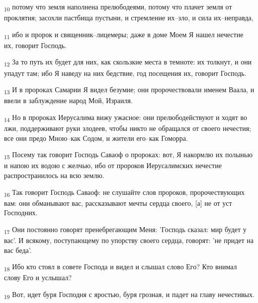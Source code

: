 \begin{tcolorbox}
\textsubscript{10} потому что земля наполнена прелюбодеями, потому что плачет земля от проклятия; засохли пастбища пустыни, и стремление их--зло, и сила их--неправда,
\end{tcolorbox}
\begin{tcolorbox}
\textsubscript{11} ибо и пророк и священник--лицемеры; даже в доме Моем Я нашел нечестие их, говорит Господь.
\end{tcolorbox}
\begin{tcolorbox}
\textsubscript{12} За то путь их будет для них, как скользкие места в темноте: их толкнут, и они упадут там; ибо Я наведу на них бедствие, год посещения их, говорит Господь.
\end{tcolorbox}
\begin{tcolorbox}
\textsubscript{13} И в пророках Самарии Я видел безумие; они пророчествовали именем Ваала, и ввели в заблуждение народ Мой, Израиля.
\end{tcolorbox}
\begin{tcolorbox}
\textsubscript{14} Но в пророках Иерусалима вижу ужасное: они прелюбодействуют и ходят во лжи, поддерживают руки злодеев, чтобы никто не обращался от своего нечестия; все они предо Мною--как Содом, и жители его--как Гоморра.
\end{tcolorbox}
\begin{tcolorbox}
\textsubscript{15} Посему так говорит Господь Саваоф о пророках: вот, Я накормлю их полынью и напою их водою с желчью, ибо от пророков Иерусалимских нечестие распространилось на всю землю.
\end{tcolorbox}
\begin{tcolorbox}
\textsubscript{16} Так говорит Господь Саваоф: не слушайте слов пророков, пророчествующих вам: они обманывают вас, рассказывают мечты сердца своего, [а] не от уст Господних.
\end{tcolorbox}
\begin{tcolorbox}
\textsubscript{17} Они постоянно говорят пренебрегающим Меня: 'Господь сказал: мир будет у вас'. И всякому, поступающему по упорству своего сердца, говорят: 'не придет на вас беда'.
\end{tcolorbox}
\begin{tcolorbox}
\textsubscript{18} Ибо кто стоял в совете Господа и видел и слышал слово Его? Кто внимал слову Его и услышал?
\end{tcolorbox}
\begin{tcolorbox}
\textsubscript{19} Вот, идет буря Господня с яростью, буря грозная, и падет на главу нечестивых.
\end{tcolorbox}
